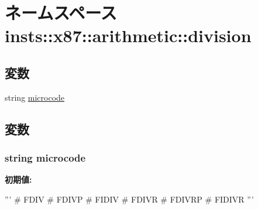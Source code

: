 \hypertarget{namespaceinsts_1_1x87_1_1arithmetic_1_1division}{
\section{ネームスペース insts::x87::arithmetic::division}
\label{namespaceinsts_1_1x87_1_1arithmetic_1_1division}
}
\subsection*{変数}
\begin{DoxyCompactItemize}
\item 
string \hyperlink{namespaceinsts_1_1x87_1_1arithmetic_1_1division_a770f11a173e99389a8802f0107ed8f52}{microcode}
\end{DoxyCompactItemize}


\subsection{変数}
\hypertarget{namespaceinsts_1_1x87_1_1arithmetic_1_1division_a770f11a173e99389a8802f0107ed8f52}{
\subsubsection[{microcode}]{\setlength{\rightskip}{0pt plus 5cm}string {\bf microcode}}}
\label{namespaceinsts_1_1x87_1_1arithmetic_1_1division_a770f11a173e99389a8802f0107ed8f52}
{\bfseries 初期値:}
\begin{DoxyCode}
'''
# FDIV
# FDIVP
# FIDIV
# FDIVR
# FDIVRP
# FIDIVR
'''
\end{DoxyCode}
